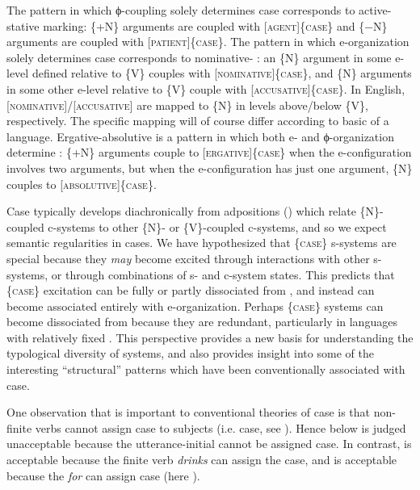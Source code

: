   The pattern in which ϕ-coupling solely determines case corresponds to active-stative marking: \{+N\} arguments are coupled with [\textsc{agent}]\{\textsc{case}\} and \{−N\} arguments are coupled with [\textsc{patient}]\{\textsc{case}\}. The pattern in which e-organization solely determines case corresponds to nominative- : an \{N\} argument in some e-level defined relative to \{V\} couples with [\textsc{nominative}]\linebreak\{\textsc{case}\}, and \{N\} arguments in some other e-level relative to \{V\} couple with [\textsc{ac\-cu\-sa\-tive}]\{\textsc{case\}}. In English, [\textsc{nominative}]/[\textsc{accusative}] are mapped to \{N\} in levels above/below \{V\}, respectively. The specific mapping will of course differ according to basic  of a language. Ergative-absolutive is a pattern in which both e- and ϕ-organization determine : \{+N\} arguments couple to [\textsc{ergative}]\{\textsc{case}\} when the e-configuration involves two arguments, but when the e-configuration has just one argument, \{N\} couples to [\textsc{absolutive}]\{\textsc{case}\}.

  Case typically develops diachronically from adpositions (\citealt{Heine2009,TraugottHeine1991}) which relate \{N\}-coupled c-systems to other \{N\}- or \{V\}-coupled c-systems, and so we expect semantic regularities in cases. We have hypothesized that \{\textsc{case}\} s-systems are special because they \textit{may} become excited through interactions with other s-systems, or through combinations of s- and c-system states. This predicts that \{\textsc{case}\} excitation can be fully or partly dissociated from , and instead can become associated entirely with e-organization. Perhaps \{\textsc{case}\} systems can become dissociated from  because they are redundant, particularly in languages with relatively fixed . This perspective provides a new basis for understanding the typological diversity of  systems, and also provides insight into some of the interesting “structural” patterns which have been conventionally associated with case. 

  One observation that is important to conventional theories of case is that non-finite verbs cannot assign case to subjects (i.e.  case, see \citealt{Chomsky1980,ChomskyLasnik1977,Vergnaud2006}). Hence  below is judged unacceptable because the utterance-initial  cannot be assigned case. In contrast,  is acceptable because the finite verb \textit{drinks} can assign the  case, and  is acceptable because the  \textit{for} can assign case (here ).

